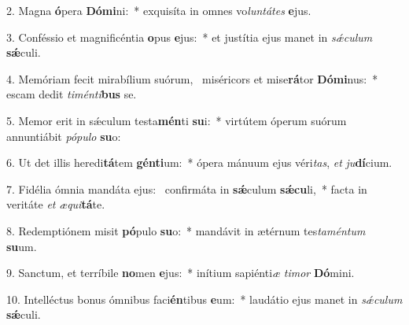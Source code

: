 2. Magna \textbf{ó}pera \textbf{Dó}\textbf{mi}ni:~*  exquisíta in omnes vo\textit{lun}\textit{tá}\textit{tes} \textbf{e}jus.\

3. Conféssio et magnificéntia \textbf{o}pus \textbf{e}jus:~*  et justítia ejus manet in \textit{sǽ}\textit{cu}\textit{lum} \textbf{sǽ}culi.\

4. Memóriam fecit mirabílium suórum, \dag\  miséricors et mise\textbf{rá}tor \textbf{Dó}\textbf{mi}nus:~*  escam dedit \textit{ti}\textit{mén}\textit{ti}\textbf{bus} se.\

5. Memor erit in sǽculum testa\textbf{mén}ti \textbf{su}i:~*  virtútem óperum suórum annuntiábit \textit{pó}\textit{pu}\textit{lo} \textbf{su}o:\

6. Ut det illis heredi\textbf{tá}tem \textbf{gén}\textbf{ti}um:~*  ópera mánuum ejus véri\textit{tas}, \textit{et} \textit{ju}\textbf{dí}cium.\

7. Fidélia ómnia mandáta ejus: \dag\  confirmáta in \textbf{sǽ}culum \textbf{sǽ}\textbf{cu}li,~*  facta in veritáte \textit{et} \textit{æ}\textit{qui}\textbf{tá}te.\

8. Redemptiónem misit \textbf{pó}pulo \textbf{su}o:~*  mandávit in ætérnum tes\textit{ta}\textit{mén}\textit{tum} \textbf{su}um.\

9. Sanctum, et terríbile \textbf{no}men \textbf{e}jus:~*  inítium sapiénti\textit{æ} \textit{ti}\textit{mor} \textbf{Dó}mini.\

10. Intelléctus bonus ómnibus faci\textbf{én}tibus \textbf{e}um:~*  laudátio ejus manet in \textit{sǽ}\textit{cu}\textit{lum} \textbf{sǽ}culi.\

